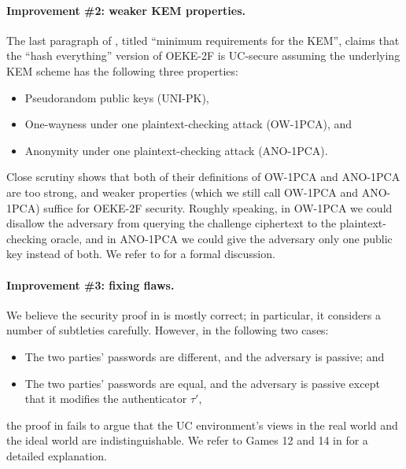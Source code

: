 \documentclass{article}
\theoremstyle{plain}
\theoremstyle{definition}
\theoremstyle{remark}
\begin{document}
\paragraph{Improvement \#2: weaker KEM properties.}
The last paragraph of \cite{EPRINT:ArrBarJar25}, titled ``minimum requirements for the KEM'', claims that the ``hash everything'' version of OEKE-2F is UC-secure assuming the underlying KEM scheme has the following three properties:
\begin{itemize}
  \item Pseudorandom public keys (UNI-PK),
  \item One-wayness under one plaintext-checking attack (OW-1PCA), and
  \item Anonymity under one plaintext-checking attack (ANO-1PCA).
\end{itemize}
Close scrutiny shows that both of their definitions of OW-1PCA and ANO-1PCA are too strong, and weaker properties (which we still call OW-1PCA and ANO-1PCA) suffice for OEKE-2F security. Roughly speaking, in OW-1PCA we could disallow the adversary from querying the challenge ciphertext to the plaintext-checking oracle, and in ANO-1PCA we could give the adversary only one public key instead of both. We refer to  for a formal discussion.

\paragraph{Improvement \#3: fixing flaws.}
We believe the security proof in \cite{EPRINT:ArrBarJar25} is mostly correct; in particular, it considers a number of subtleties carefully. However, in the following two cases:
\begin{itemize}
  \item The two parties' passwords are different, and the adversary is passive; and
  \item The two parties' passwords are equal, and the adversary is passive except that it modifies the authenticator $\tau'$,
\end{itemize}
the proof in \cite{EPRINT:ArrBarJar25} fails to argue that the UC environment's views in the real world and the ideal world are indistinguishable. We refer to Games 12 and 14 in  for a detailed explanation.
\end{document}
